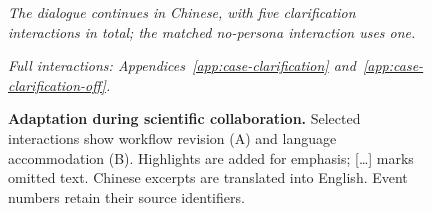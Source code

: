 \begin{figure}[htbp]
\begin{minipage}[t]{0.49\linewidth}
\begin{tcolorbox}[colback=gray!3,colframe=gray!55,boxrule=0.5pt,
  arc=1pt,left=6pt,right=6pt,top=6pt,bottom=6pt,
  fontupper=\footnotesize]
\textit{The dialogue continues in Chinese, with five clarification
interactions in total; the matched no-persona interaction uses one.}\par
\textit{Full interactions: Appendices~\ref{app:case-clarification}
and~\ref{app:case-clarification-off}.}
\end{tcolorbox}
\end{minipage}
\endgroup
\caption{\textbf{Adaptation during scientific collaboration.}
Selected interactions show workflow revision (A) and language accommodation
(B). Highlights are added for emphasis; [\ldots] marks omitted text.
Chinese excerpts are translated into English. Event numbers retain their
source identifiers.}
\label{fig:discussion-cases}
\end{figure}
